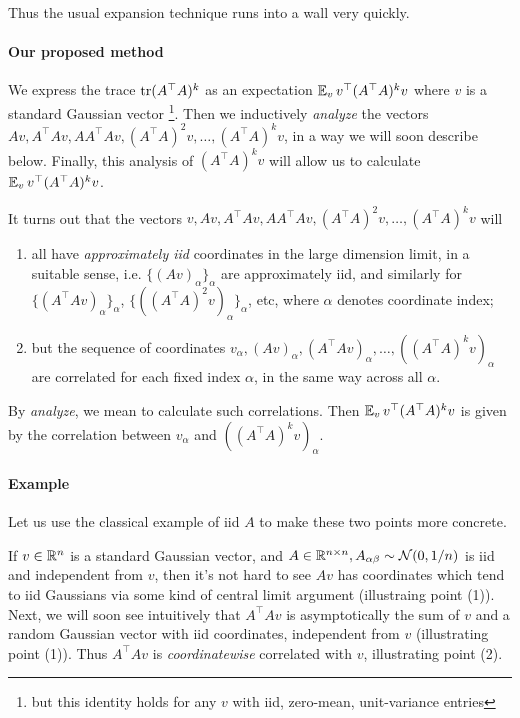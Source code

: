 \documentclass{article}
\theoremstyle{definition}
\theoremstyle{remark}
\newcommand{\trsp}{\top}
\begin{document}
Thus the usual expansion technique runs into a wall very quickly.

\paragraph*{Our proposed method}
We express the trace $\tr(A^{\trsp}A)^{k}$ as an expectation $\EV_{v}v^{\trsp}(A^{\trsp}A)^{k}v$ where $v$ is a standard Gaussian vector%
\footnote{but this identity holds for any $v$ with iid, zero-mean, unit-variance entries}. Then we inductively \emph{analyze} the vectors $Av,A^{\trsp}Av,AA^{\trsp}Av,(A^{\trsp}A)^{2}v,\ldots,(A^{\trsp}A)^{k}v$, in a way we will soon describe below. Finally, this analysis of $(A^{\trsp}A)^{k}v$ will allow us to calculate $\EV_{v}v^{\trsp}(A^{\trsp}A)^{k}v$.

It turns out that the vectors $v,Av,A^{\trsp}Av,AA^{\trsp}Av,(A^{\trsp}A)^{2}v,\ldots,(A^{\trsp}A)^{k}v$ will 
\begin{enumerate}
  \item all have \emph{approximately iid} coordinates in the large dimension limit, in a suitable sense, i.e. $\{(Av)_{\alpha}\}_{\alpha}$ are approximately iid, and similarly for $\{(A^{\trsp}Av)_{\alpha}\}_{\alpha}$, $\{((A^{\trsp}A)^{2}v)_{\alpha}\}_{\alpha}$, etc, where $\alpha$ denotes coordinate index; \label{item:_approxiid}
  \item but the sequence of coordinates $v_{\alpha},(Av)_{\alpha},(A^{\trsp}Av)_{\alpha},\ldots,((A^{\trsp}A)^{k}v)_{\alpha}$ are correlated for each fixed index $\alpha$, in the same way across all $\alpha$. \label{item:_cor}
\end{enumerate}
By \emph{analyze}, we mean to calculate such correlations.
Then $\EV_{v}v^{\trsp}(A^{\trsp}A)^{k}v$ is given by the correlation between $v_\alpha$ and $((A^{\trsp}A)^{k}v)_{\alpha}$.

\paragraph*{Example}
Let us use the classical example of iid $A$ to make these two points more concrete.

If $v\in\mathbb{R}^{n}$ is a standard Gaussian vector, and $A\in\mathbb{R}^{n\times n},A_{\alpha\beta}\sim\mathcal{N}(0,1/n)$ is iid and independent from $v$, then it's not hard to see $Av$ has coordinates which tend to iid Gaussians via some kind of central limit argument (illustraing point (1)). Next, we will soon see intuitively that $A^{\trsp}Av$ is asymptotically the sum of $v$ and a random Gaussian vector with iid coordinates, independent from $v$ (illustrating point (1)). Thus $A^{\trsp}Av$ is \emph{coordinatewise }correlated with $v$, illustrating point (2). 
\end{document}
